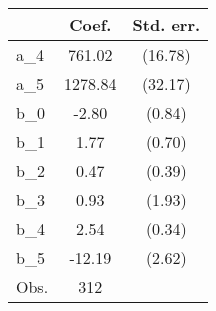{
\def\sym#1{\ifmmode^{#1}\else\(^{#1}\)\fi}
\begin{tabular}{l*{1}{cc}}
\hline\hline
                &    Coef.&Std. err.\\
\hline
a\_4             &   761.02&  (16.78)\\
a\_5             &  1278.84&  (32.17)\\
b\_0             &    -2.80&   (0.84)\\
b\_1             &     1.77&   (0.70)\\
b\_2             &     0.47&   (0.39)\\
b\_3             &     0.93&   (1.93)\\
b\_4             &     2.54&   (0.34)\\
b\_5             &   -12.19&   (2.62)\\
\hline
Obs.            &      312&         \\
\hline\hline
\end{tabular}
}
